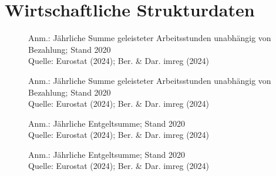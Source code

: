 
\section{Wirtschaftliche Strukturdaten}


\begin{figure}[p]
	{\centering {}}
	\label{map:stundengeleistet}
	\begin{spacing}{1} \scriptsize
		Anm.: Jährliche Summe geleisteter Arbeitsstunden unabhängig von Bezahlung; Stand 2020\\
		Quelle: Eurostat (2024); Ber. \& Dar. imreg (2024) \end{spacing}
\end{figure}


\begin{figure}[p]
	{\centering {}}
	\label{map:stundengeleistetprokopf}
	\begin{spacing}{1} \scriptsize
		Anm.: Jährliche Summe geleisteter Arbeitsstunden unabhängig von Bezahlung; Stand 2020\\
		Quelle: Eurostat (2024); Ber. \& Dar. imreg (2024) \end{spacing}
\end{figure}


\begin{figure}[p]
	{\centering {}}
	\label{map:entgelt}
	\begin{spacing}{1} \scriptsize
		Anm.: Jährliche Entgeltsumme; Stand 2020\\
		Quelle: Eurostat (2024); Ber. \& Dar. imreg (2024) \end{spacing}
\end{figure}


\begin{figure}[p]
	{\centering {}}
	\label{map:entgeltprokopf}
	\begin{spacing}{1} \scriptsize
		Anm.: Jährliche Entgeltsumme; Stand 2020\\
		Quelle: Eurostat (2024); Ber. \& Dar. imreg (2024) 
	\end{spacing}
\end{figure}



